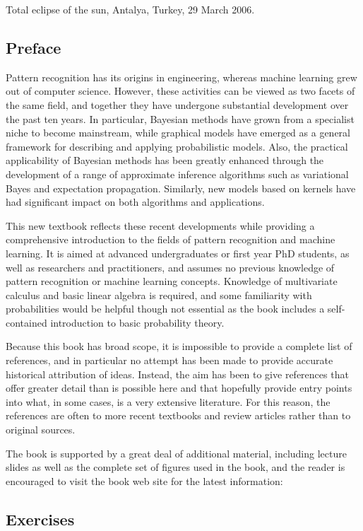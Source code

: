 \documentclass[
  10
]{article}
\begin{document}
Total eclipse of the sun, Antalya, Turkey, 29 March 2006.

\subsection{Preface}\label{preface}

Pattern recognition has its origins in engineering, whereas machine
learning grew out of computer science. However, these activities can be
viewed as two facets of the same field, and together they have undergone
substantial development over the past ten years. In particular, Bayesian
methods have grown from a specialist niche to become mainstream, while
graphical models have emerged as a general framework for describing and
applying probabilistic models. Also, the practical applicability of
Bayesian methods has been greatly enhanced through the development of a
range of approximate inference algorithms such as variational Bayes and
expectation propagation. Similarly, new models based on kernels have had
significant impact on both algorithms and applications.

This new textbook reflects these recent developments while providing a
comprehensive introduction to the fields of pattern recognition and
machine learning. It is aimed at advanced undergraduates or first year
PhD students, as well as researchers and practitioners, and assumes no
previous knowledge of pattern recognition or machine learning concepts.
Knowledge of multivariate calculus and basic linear algebra is required,
and some familiarity with probabilities would be helpful though not
essential as the book includes a self-contained introduction to basic
probability theory.

Because this book has broad scope, it is impossible to provide a
complete list of references, and in particular no attempt has been made
to provide accurate historical attribution of ideas. Instead, the aim
has been to give references that offer greater detail than is possible
here and that hopefully provide entry points into what, in some cases,
is a very extensive literature. For this reason, the references are
often to more recent textbooks and review articles rather than to
original sources.

The book is supported by a great deal of additional material, including
lecture slides as well as the complete set of figures used in the book,
and the reader is encouraged to visit the book web site for the latest
information:

\subsection{Exercises}\label{exercises}
\end{document}
